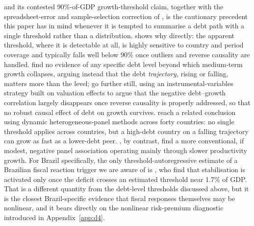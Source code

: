 \documentclass[11pt,a4paper]{article}
\begin{document}
\citet{reinhartrogoff2010} and its contested 90\%-of-GDP growth-threshold claim, together with the spreadsheet-error and sample-selection correction of \citet{herndonashpollin2014}, is the cautionary precedent this paper has in mind whenever it is tempted to summarise a debt path with a single threshold rather than a distribution. \citet{egert2015} shows why directly: the apparent threshold, where it is detectable at all, is highly sensitive to country and period coverage and typically falls well below 90\% once outliers and reverse causality are handled. \citet{pescatorisandrisimon2014} find no evidence of any specific debt level beyond which medium-term growth collapses, arguing instead that the debt \emph{trajectory}, rising or falling, matters more than the level; \citet{panizzapresbitero2014} go further still, using an instrumental-variables strategy built on valuation effects to argue that the negative debt--growth correlation largely disappears once reverse causality is properly addressed, so that no robust causal effect of debt on growth survives. \citet{chudiketal2017} reach a related conclusion using dynamic heterogeneous-panel methods across forty countries: no single threshold applies across countries, but a high-debt country on a falling trajectory can grow as fast as a lower-debt peer. \citet{wookumar2015}, by contrast, find a more conventional, if modest, negative panel association operating mainly through slower productivity growth. For Brazil specifically, the only threshold-autoregressive estimate of a Brazilian fiscal reaction trigger we are aware of is \citet{simonassilima2005}, who find that stabilisation is activated only once the deficit crosses an estimated threshold near 1.7\% of GDP. That is a different quantity from the debt-level thresholds discussed above, but it is the closest Brazil-specific evidence that fiscal responses themselves may be nonlinear, and it bears directly on the nonlinear risk-premium diagnostic introduced in Appendix~\ref{app:d4}.
\end{document}
